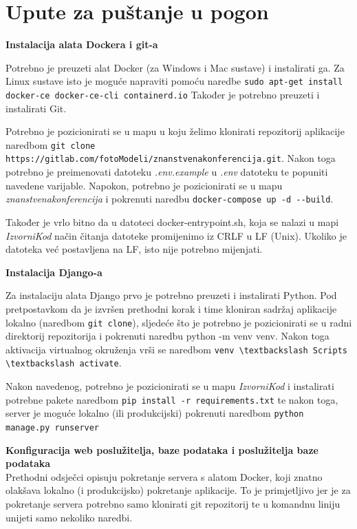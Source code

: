 		
		\section{Upute za puštanje u pogon}

			\textbf{Instalacija alata Dockera i git-a}

			Potrebno je preuzeti alat Docker (za Windows i Mac sustave) i instalirati ga. Za Linux sustave isto je moguće napraviti pomoću naredbe \verb|sudo apt-get install docker-ce docker-ce-cli containerd.io| Također je potrebno preuzeti i instalirati Git.

			Potrebno je pozicionirati se u mapu u koju želimo klonirati repozitorij aplikacije naredbom \verb|git clone https://gitlab.com/fotoModeli/znanstvenakonferencija.git|. Nakon toga potrebno je preimenovati datoteku \textit{.env.example} u \textit{.env} datoteku te popuniti navedene varijable. Napokon, potrebno je pozicionirati se u mapu \textit{znanstvenakonferencija} i pokrenuti naredbu \verb|docker-compose up -d --build|.

			Također je vrlo bitno da u datoteci docker-entrypoint.sh, koja se nalazi u mapi \textit{IzvorniKod} način čitanja datoteke promijenimo iz CRLF u LF (Unix). Ukoliko je datoteka već postavljena na LF, isto nije potrebno mijenjati.

			\textbf{Instalacija Django-a}

			Za instalaciju alata Django prvo je potrebno preuzeti i instalirati Python. Pod pretpostavkom da je izvršen prethodni korak i time kloniran sadržaj aplikacije lokalno (naredbom \verb|git clone|), sljedeće što je potrebno je pozicionirati se u radni direktorij repozitorija i pokrenuti naredbu python -m venv venv. Nakon toga aktivacija virtualnog okruženja vrši se naredbom \verb|venv \textbackslash Scripts \textbackslash activate|.

			Nakon navedenog, potrebno je pozicionirati se u mapu \textit{IzvorniKod} i instalirati potrebne pakete naredbom \verb|pip install -r requirements.txt| te nakon toga, server je moguće lokalno (ili produkcijski) pokrenuti naredbom \verb|python manage.py runserver| 
		\eject
		
			\textbf{Konfiguracija web poslužitelja, baze podataka i poslužitelja baze podataka}\\

			Prethodni odsječci opisuju pokretanje servera s alatom Docker, koji znatno olakšava lokalno (i produkcijsko) pokretanje aplikacije. To je primjetljivo jer je za pokretanje servera potrebno samo klonirati git repozitorij te u komandnu liniju unijeti samo nekoliko naredbi.
			
			
			\eject 